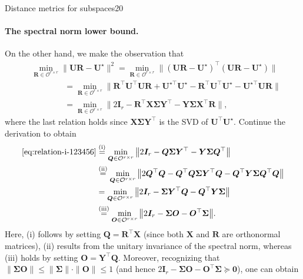 \documentclass{article}
\begin{document}
\begin{problem}{Distance metrics for subspaces}{20}
{\paragraph{The spectral norm lower bound.}
On the other hand, we make the observation that
%
\begin{align}
	& \min_{\bm{R}\in\mathcal{O}^{r\times r}}\big\|\bm{U}\bm{R}-\bm{U}^{\star}\big\|^{2}  =\min_{\bm{R}\in\mathcal{O}^{r\times r}}\big\|(\bm{U}\bm{R}-\bm{U}^{\star})^{\top}(\bm{U}\bm{R}-\bm{U}^{\star})\big\|\nonumber \\
 & \qquad\qquad =\min_{\bm{R}\in\mathcal{O}^{r\times r}}\big\|\bm{R}^{\top}\bm{U}^{\top}\bm{U}\bm{R}+\bm{U}^{\star\top}\bm{U}^{\star}-\bm{R}^{\top}\bm{U}^{\top}\bm{U}^{\star}-\bm{U}^{\star\top}\bm{U}\bm{R}\big\|\nonumber \\
 & \qquad\qquad{=}\min_{\bm{R}\in\mathcal{O}^{r\times r}}\big\|2\bm{I}_{r}-\bm{R}^{\top}\bm{X}\bm{\Sigma}\bm{Y}^{\top}-\bm{Y}\bm{\Sigma}\bm{X}^{\top}\bm{R}\big\|,
	\label{eq:relation-i-123456}
\end{align}
%
where the last relation holds since $\bm{X}\bm{\Sigma}\bm{Y}^{\top}$ is the
SVD of $\bm{U}^{\top}\bm{U}^{\star}$. Continue the derivation to obtain
%
\begin{align}
\eqref{eq:relation-i-123456}  & \overset{(\mathrm{i})}{=}\min_{\bm{Q}\in\mathcal{O}^{r\times r}}\big\|2\bm{I}_{r}-\bm{Q}\bm{\Sigma}\bm{Y}^{\top}-\bm{Y}\bm{\Sigma}\bm{Q}^{\top}\big\|\nonumber \\
 & \overset{(\mathrm{ii})}{=}\min_{\bm{Q}\in\mathcal{O}^{r\times r}}\big\|2\bm{Q}^{\top}\bm{Q}-\bm{Q}^{\top}\bm{Q}\bm{\Sigma}\bm{Y}^{\top}\bm{Q}-\bm{Q}^{\top}\bm{Y}\bm{\Sigma}\bm{Q}^{\top}\bm{Q}\big\|\nonumber \\
 &  =\min_{\bm{Q}\in\mathcal{O}^{r\times r}}\big\|2\bm{I}_{r}-\bm{\Sigma}\bm{Y}^{\top}\bm{Q}-\bm{Q}^{\top}\bm{Y}\bm{\Sigma}\big\|\nonumber \\
 &  \overset{(\mathrm{iii})}{=}\min_{\bm{O}\in\mathcal{O}^{r\times r}}\big\|2\bm{I}_{r}-\bm{\Sigma}\bm{O}-\bm{O}^{\top}\bm{\Sigma}\big\|.\label{eq:UR-Ustar-identity}
\end{align}
%
Here, (i) follows by setting $\bm{Q}=\bm{R}^{\top}\bm{X}$
(since both $\bm{X}$ and $\bm{R}$ are orthonormal matrices), (ii)
results from the unitary invariance of the spectral norm, whereas (iii) holds
by setting $\bm{O}=\bm{Y}^{\top}\bm{Q}$. Moreover, recognizing that
$\|\bm{\Sigma}\bm{O}\|\leq\|\bm{\Sigma}\| \cdot \|\bm{O}\|\leq1$ (and hence
$2\bm{I}_{r}-\bm{\Sigma}\bm{O}-\bm{O}^{\top}\bm{\Sigma}\succeq\bm{0}$),
one can obtain
}
\end{problem}
\end{document}
